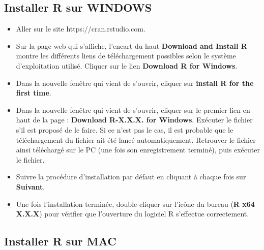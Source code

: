 \documentclass[
  letterpaper,
]{book}
\providecommand{\tightlist}{%
  \setlength{\itemsep}{0pt}\setlength{\parskip}{0pt}}\usepackage{longtable,booktabs,array}
\begin{document}
\subsection{Installer R sur WINDOWS}\label{installer-r-sur-windows}

\begin{itemize}
\tightlist
\item
  Aller sur le site https://cran.rstudio.com.
\item
  Sur la page web qui s'affiche, l'encart du haut \textbf{Download and
  Install R} montre les différents liens de téléchargement possibles
  selon le système d'exploitation utilisé. Cliquer sur le lien
  \textbf{Download R for Windows}.
\item
  Dans la nouvelle fenêtre qui vient de s'ouvrir, cliquer sur
  \textbf{install R for the first time}.
\item
  Dans la nouvelle fenêtre qui vient de s'ouvrir, cliquer sur le premier
  lien en haut de la page : \textbf{Download R-X.X.X. for Windows}.
  Exécuter le fichier s'il est proposé de le faire. Si ce n'est pas le
  cas, il est probable que le téléchargement du fichier ait été lancé
  automatiquement. Retrouver le fichier ainsi téléchargé sur le PC (une
  fois son enregistrement terminé), puis exécuter le fichier.
\item
  Suivre la procédure d'installation par défaut en cliquant à chaque
  fois sur \textbf{Suivant}.
\item
  Une fois l'installation terminée, double-cliquer sur l'icône du bureau
  (\textbf{R x64 X.X.X}) pour vérifier que l'ouverture du logiciel R
  s'effectue correctement.
\end{itemize}

\subsection{Installer R sur MAC}\label{installer-r-sur-mac}
\end{document}
